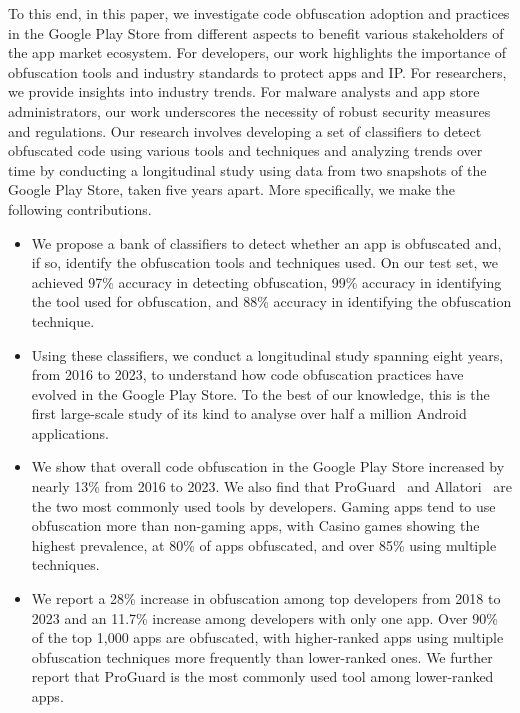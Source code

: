 To this end, in this paper, we investigate code obfuscation adoption and practices in the Google Play Store from different aspects to benefit various stakeholders of the app market ecosystem. For developers, our work highlights the importance of obfuscation tools and industry standards to protect apps and IP. For researchers, we provide insights into industry trends. For malware analysts and app store administrators, our work underscores the necessity of robust security measures and regulations. Our research involves developing a set of classifiers to detect obfuscated code using various tools and techniques and analyzing trends over time by conducting a longitudinal study using data from two snapshots of the Google Play Store, taken five years apart. More specifically, we make the following contributions.

\begin{itemize}
\IEEEpubidadjcol
    \item We propose a bank of classifiers to detect whether an app is obfuscated and, if so, identify the obfuscation tools and techniques used. On our test set, we achieved 97\% accuracy in detecting obfuscation, 99\% accuracy in identifying the tool used for obfuscation, and 88\% accuracy in identifying the obfuscation technique. 
   
    \item Using these classifiers, we conduct a longitudinal study spanning eight years, from 2016 to 2023, to understand how code obfuscation practices have evolved in the Google Play Store. To the best of our knowledge, this is the first large-scale study of its kind to analyse over half a million Android applications.
    
    \item We show that overall code obfuscation in the Google Play Store increased by nearly 13\% from 2016 to 2023. We also find that ProGuard~\cite{proguard} and Allatori~\cite{allatori} are the two most commonly used tools by developers. Gaming apps tend to use obfuscation more than non-gaming apps, with Casino games showing the highest prevalence, at 80\% of apps obfuscated, and over 85\% using multiple techniques.

    \item We report a 28\% increase in obfuscation among top developers from 2018 to 2023 and an 11.7\% increase among developers with only one app. Over 90\% of the top 1,000 apps are obfuscated, with higher-ranked apps using multiple obfuscation techniques more frequently than lower-ranked ones. We further report that ProGuard is the most commonly used tool among lower-ranked apps.

\end{itemize}

